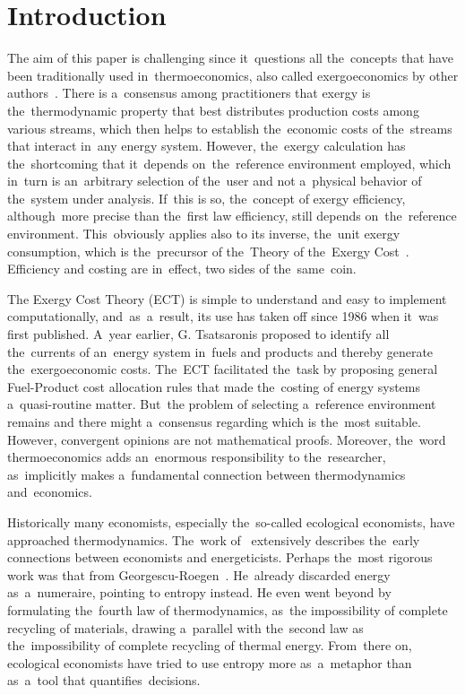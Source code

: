 \documentclass[energies,article,accept,moreauthors,pdftex]{Definitions/mdpi}
\begin{document}
\section{Introduction}
The aim of this paper is challenging since it~questions all the~concepts that have been traditionally used in~thermoeconomics, also called exergoeconomics by other authors~\cite{Tsatsaronis1985b}. There is a~consensus among practitioners that exergy is the~thermodynamic property that best distributes production costs among various streams, which then helps to establish the~economic costs of the~streams that interact in~any energy system. However, the~exergy calculation has the~shortcoming that it~depends on~the~reference environment employed, which in~turn is an~arbitrary selection of the~user and not a~physical behavior of the~system under analysis. If~this is so, the~concept of exergy efficiency, although~more precise than the~first law efficiency, still depends on~the~reference environment. This~obviously applies also to its inverse, the~unit exergy consumption, which is the~precursor of the~Theory of the~Exergy Cost~\cite{Valero1986a,Lozano1993}. Efficiency and costing are in~effect, two sides of the~same~coin.

The Exergy Cost Theory (ECT) is simple to understand and easy to implement computationally, and~as~a~result, its use has taken off since 1986 when it~was first published. A~year earlier, G. Tsatsaronis proposed to identify all the~currents of an~energy system in~fuels and products and thereby generate the~exergoeconomic costs. The~ECT facilitated the~task by proposing general Fuel-Product cost allocation rules that made the~costing of energy systems a~quasi-routine matter. But~the problem of selecting a~reference environment remains and there might a~consensus regarding which is the~most suitable. However, convergent opinions are not mathematical proofs. Moreover, the~word thermoeconomics adds an~enormous responsibility to the~researcher, as~implicitly makes a~fundamental connection between thermodynamics and~economics.

Historically many economists, especially the~so-called ecological economists, have approached thermodynamics. The~work of~\cite{MartinezAlier1987} extensively describes the~early connections between economists and energeticists. Perhaps the~most rigorous work was that from Georgescu-Roegen~\cite{GeorgescuRoegen1971}. He~already discarded energy as~a~numeraire, pointing to entropy instead. He even went beyond by formulating the~fourth law of thermodynamics, as~the impossibility of complete recycling of materials, drawing a~parallel with the~second law as the~impossibility of complete recycling of thermal energy. From~there on, ecological economists have tried to use entropy more as~a~metaphor than as~a~tool that quantifies~decisions.
\end{document}
